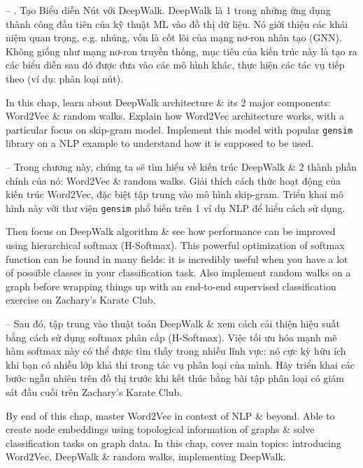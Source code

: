 \documentclass{article}
\begin{document}
\begin{itemize}
    -- {. Tạo Biểu diễn Nút với DeepWalk.} DeepWalk là 1 trong những ứng dụng thành công đầu tiên của kỹ thuật ML vào đồ thị dữ liệu. Nó giới thiệu các khái niệm quan trọng, e.g. nhúng, vốn là cốt lõi của mạng nơ-ron nhân tạo (GNN). Không giống như mạng nơ-ron truyền thống, mục tiêu của kiến trúc này là tạo ra các biểu diễn sau đó được đưa vào các mô hình khác, thực hiện các tác vụ tiếp theo (ví dụ: phân loại nút).

    In this chap, learn about DeepWalk architecture \& its 2 major components: Word2Vec \& random walks. Explain how Word2Vec architecture works, with a particular focus on skip-gram model. Implement this model with popular {\tt gensim} library on a NLP example to understand how it is supposed to be used.

    -- Trong chương này, chúng ta sẽ tìm hiểu về kiến trúc DeepWalk \& 2 thành phần chính của nó: Word2Vec \& random walks. Giải thích cách thức hoạt động của kiến trúc Word2Vec, đặc biệt tập trung vào mô hình skip-gram. Triển khai mô hình này với thư viện {\tt gensim} phổ biến trên 1 ví dụ NLP để hiểu cách sử dụng.

    Then focus on DeepWalk algorithm \& see how performance can be improved using hierarchical softmax (H-Softmax). This powerful optimization of softmax function can be found in many fields: it is incredibly useful when you have a lot of possible classes in your classification task. Also implement random walks on a graph before wrapping things up with an end-to-end supervised classification exercise on Zachary's Karate Club.

    -- Sau đó, tập trung vào thuật toán DeepWalk \& xem cách cải thiện hiệu suất bằng cách sử dụng softmax phân cấp (H-Softmax). Việc tối ưu hóa mạnh mẽ hàm softmax này có thể được tìm thấy trong nhiều lĩnh vực: nó cực kỳ hữu ích khi bạn có nhiều lớp khả thi trong tác vụ phân loại của mình. Hãy triển khai các bước ngẫu nhiên trên đồ thị trước khi kết thúc bằng bài tập phân loại có giám sát đầu cuối trên Zachary's Karate Club.

    By end of this chap, master Word2Vec in context of NLP \& beyond. Able to create node embeddings using topological information of graphs \& solve classification tasks on graph data. In this chap, cover main topics: introducing Word2Vec, DeepWalk \& random walks, implementing DeepWalk.


\end{itemize}
\end{document}
